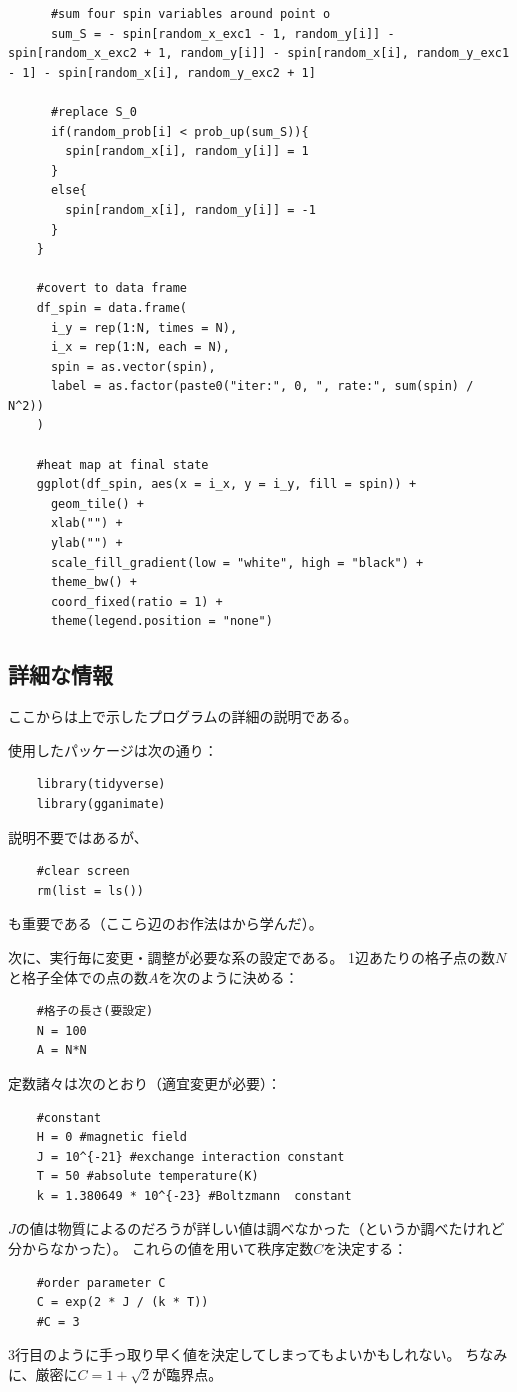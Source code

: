 \documentclass[fontsize = 12pt]{jlreq}
\begin{document}
\begin{lstlisting}
      #sum four spin variables around point o
      sum_S = - spin[random_x_exc1 - 1, random_y[i]] - spin[random_x_exc2 + 1, random_y[i]] - spin[random_x[i], random_y_exc1 - 1] - spin[random_x[i], random_y_exc2 + 1]
      
      #replace S_0
      if(random_prob[i] < prob_up(sum_S)){
        spin[random_x[i], random_y[i]] = 1
      }
      else{
        spin[random_x[i], random_y[i]] = -1
      }
    }
    
    #covert to data frame
    df_spin = data.frame(
      i_y = rep(1:N, times = N), 
      i_x = rep(1:N, each = N), 
      spin = as.vector(spin), 
      label = as.factor(paste0("iter:", 0, ", rate:", sum(spin) / N^2))
    )
    
    #heat map at final state
    ggplot(df_spin, aes(x = i_x, y = i_y, fill = spin)) +
      geom_tile() +
      xlab("") +
      ylab("") +
      scale_fill_gradient(low = "white", high = "black") +
      theme_bw() +
      coord_fixed(ratio = 1) +
      theme(legend.position = "none")
\end{lstlisting}

\subsection{詳細な情報}

ここからは上で示したプログラムの詳細の説明である。

使用したパッケージは次の通り：
\begin{lstlisting}
    library(tidyverse)
    library(gganimate)
\end{lstlisting}
説明不要ではあるが、
\begin{lstlisting}
    #clear screen
    rm(list = ls())
\end{lstlisting}
も重要である（ここら辺のお作法は\cite{生命}から学んだ）。

次に、実行毎に変更・調整が必要な系の設定である。
1辺あたりの格子点の数$N$と格子全体での点の数$A$を次のように決める：
\begin{lstlisting}
    #格子の長さ(要設定)
    N = 100
    A = N*N
\end{lstlisting}
定数諸々は次のとおり（適宜変更が必要）：
\begin{lstlisting}
    #constant
    H = 0 #magnetic field
    J = 10^{-21} #exchange interaction constant
    T = 50 #absolute temperature(K)
    k = 1.380649 * 10^{-23} #Boltzmann  constant
\end{lstlisting}
$J$の値は物質によるのだろうが詳しい値は調べなかった（というか調べたけれど分からなかった）。
これらの値を用いて秩序定数$C$を決定する：
\begin{lstlisting}
    #order parameter C
    C = exp(2 * J / (k * T))
    #C = 3
\end{lstlisting}
3行目のように手っ取り早く値を決定してしまってもよいかもしれない。
ちなみに、厳密に$C = 1 + \sqrt{2}$が臨界点\cite{田崎統計}。
\end{document}
